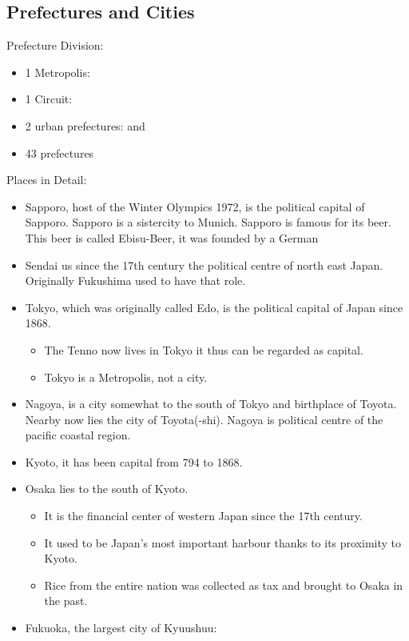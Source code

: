 \documentclass{article}
\begin{document}
\subsection{Prefectures and Cities}
Prefecture Division:
\begin{itemize}
\item 1 Metropolis: 
\item 1 Circuit: 
\item 2 urban prefectures:  and 
\item 43 prefectures  
\end{itemize}
Places in Detail:
\begin{itemize}
\item Sapporo, host of the Winter Olympics 1972, is the political capital of Sapporo. Sapporo is a sistercity to Munich. Sapporo is famous for its beer. This beer is called Ebisu-Beer, it was founded by a German
\item Sendai us since the 17th century the political centre of north east Japan. Originally Fukushima used to have that role. 
\item Tokyo, which was originally called Edo, is the political capital of Japan since 1868.
\begin{itemize}
\item The Tenno now lives in Tokyo it thus can be regarded as capital.
\item Tokyo is a Metropolis, not a city.
\end{itemize}
\item Nagoya, is a city somewhat to the south of Tokyo and birthplace of Toyota. Nearby now lies the city of Toyota(-shi). Nagoya is political centre of the pacific coastal region.
\item Kyoto, it has been capital from 794 to 1868. 
\item Osaka lies to the south of Kyoto.  
\begin{itemize}
\item It is the financial center of western Japan since the 17th century.
\item It used to be Japan's most important harbour thanks to its proximity to Kyoto. 
\item Rice from the entire nation was collected as tax and brought to Osaka in the past.
\end{itemize}
\item Fukuoka, the largest city of Kyuushuu:

\end{itemize}
\end{document}
